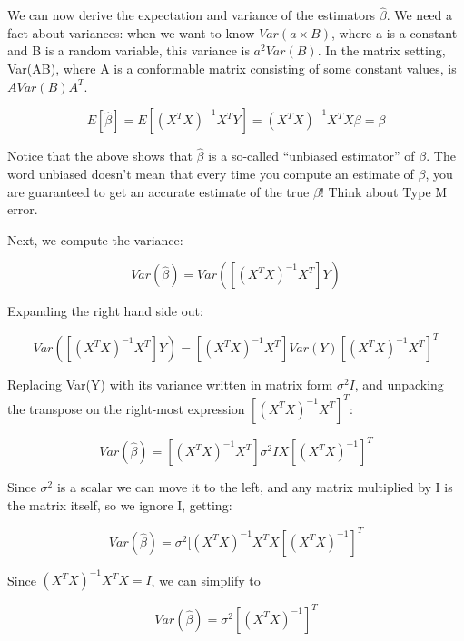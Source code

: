 \documentclass[
  12pt,
]{krantz}
\theoremstyle{definition}
\theoremstyle{definition}
\theoremstyle{definition}
\theoremstyle{definition}
\theoremstyle{remark}
\begin{document}
We can now derive the expectation and variance of the estimators \(\hat\beta\). We need a fact about variances: when we want to know \(Var(a\times B)\), where a is a constant and B is a random variable, this variance is \(a^2 Var(B)\). In the matrix setting, Var(AB), where A is a conformable matrix consisting of some constant values, is \(A Var(B)A^T\).

\begin{equation}
E[\hat\beta] = E[(X^TX)^{-1}X^T Y] = (X^TX)^{-1}X^T X\beta = \beta
\end{equation}

Notice that the above shows that \(\hat\beta\) is a so-called ``unbiased estimator'' of \(\beta\). The word unbiased doesn't mean that every time you compute an estimate of \(\beta\), you are guaranteed to get an accurate estimate of the true \(\beta\)! Think about Type M error.

Next, we compute the variance:

\begin{equation}
Var(\hat\beta) = Var([(X^TX)^{-1}X^T] Y)
\end{equation}

Expanding the right hand side out:

\begin{equation}
Var([(X^TX)^{-1}X^T] Y) = [(X^TX)^{-1}X^T] Var(Y)  [(X^TX)^{-1}X^T]^{T}
\end{equation}

Replacing Var(Y) with its variance written in matrix form \(\sigma^2 I\), and unpacking the transpose on the right-most expression \([(X^TX)^{-1}X^T]^{T}\):

\begin{equation}
Var(\hat\beta)= [(X^TX)^{-1}X^T] \sigma^2 I  X[(X^TX)^{-1}]^{T} 
\end{equation}

Since \(\sigma^2\) is a scalar we can move it to the left, and any matrix multiplied by I is the matrix itself, so we ignore I, getting:

\begin{equation}
Var(\hat\beta)= \sigma^2 [(X^TX)^{-1}X^T X[(X^TX)^{-1}]^{T} 
\end{equation}

Since \((X^TX)^{-1}X^T X = I\), we can simplify to

\begin{equation}
Var(\hat\beta)= \sigma^2 [(X^TX)^{-1}]^{T} 
\end{equation}
\end{document}

